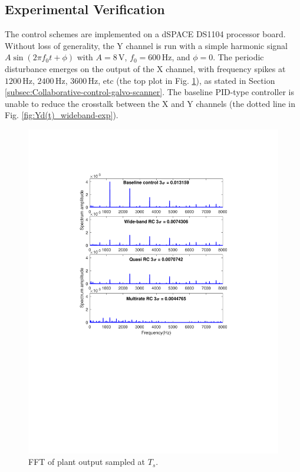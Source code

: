 \documentclass [11pt, proquest] {uwthesis}[2020/02/24]
\begin{document}
\subsection{Experimental Verification} \label{subsec:Experimental-Verification-Galvo-Scanner}

The control schemes are implemented on a dSPACE DS1104 processor board.
Without loss of generality, the Y channel is run with a simple harmonic
signal $A\sin(2\pi f_{0}t+\phi)$ with $A=8\,\text{V}$, $f_{0}=600\,\text{Hz}$,
and $\phi=0$. The periodic disturbance emerges on the output of the
X channel, with frequency spikes at $1200\,\text{Hz}$, $2400\,\text{Hz}$,
$3600\,\text{Hz}$, etc (the top plot in Fig. \ref{fig:FFT-exp}),
as stated in Section \ref{subsec:Collaborative-control-galvo-scanner}.
The baseline PID-type controller is unable to reduce the crosstalk
between the X and Y channels (the dotted line in Fig. \ref{fig:Yd(t)_wideband-exp}).
\begin{figure}[!ht]
\begin{centering}
\includegraphics[width=12cm]{Fractional-order-RC/Spectrum_all_exp}
\par\end{centering}
\caption{\label{fig:FFT-exp}FFT of plant output sampled at $T_{s}$.}
\end{figure}
\end{document}
